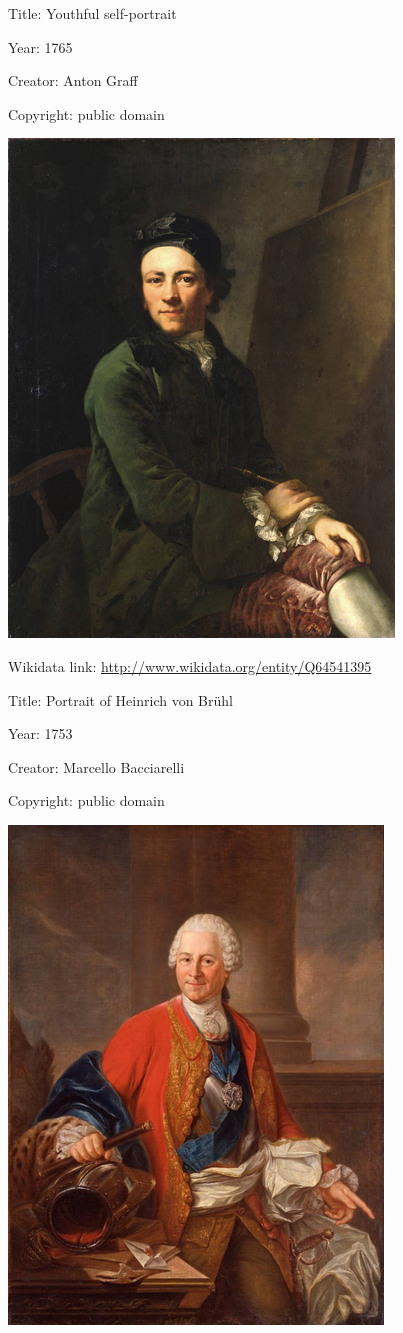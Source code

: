 \documentclass[
  letterpaper,
]{book}
\begin{document}
Title: Youthful self-portrait

Year: 1765

Creator: Anton Graff

Copyright: public domain

\includegraphics{paintings_files/figure-pdf/cell-2-output-16.png}

Wikidata link: \url{http://www.wikidata.org/entity/Q64541395}

Title: Portrait of Heinrich von Brühl

Year: 1753

Creator: Marcello Bacciarelli

Copyright: public domain

\includegraphics{paintings_files/figure-pdf/cell-2-output-18.png}
\end{document}
